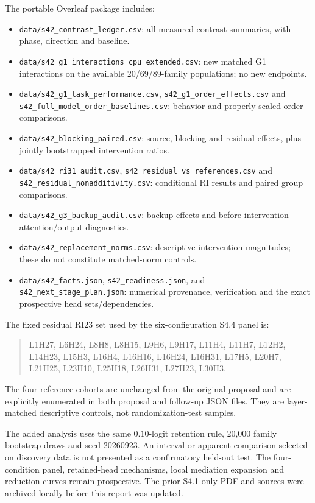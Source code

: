 \documentclass[11pt,a4paper]{article}
\newcommand{\file}[1]{\nolinkurl{#1}}
\begin{document}
The portable Overleaf package includes:
\begin{itemize}
\item \file{data/s42_contrast_ledger.csv}: all measured contrast summaries, with phase, direction and baseline.
\item \file{data/s42_g1_interactions_cpu_extended.csv}: new matched G1 interactions on the available 20/69/89-family populations; no new endpoints.
\item \file{data/s42_g1_task_performance.csv}, \file{s42_g1_order_effects.csv} and \file{s42_full_model_order_baselines.csv}: behavior and properly scaled order comparisons.
\item \file{data/s42_blocking_paired.csv}: source, blocking and residual effects, plus jointly bootstrapped intervention ratios.
\item \file{data/s42_ri31_audit.csv}, \file{s42_residual_vs_references.csv} and \file{s42_residual_nonadditivity.csv}: conditional RI results and paired group comparisons.
\item \file{data/s42_g3_backup_audit.csv}: backup effects and before-intervention attention/output diagnostics.
\item \file{data/s42_replacement_norms.csv}: descriptive intervention magnitudes; these do not constitute matched-norm controls.
\item \file{data/s42_facts.json}, \file{s42_readiness.json}, and \file{s42_next_stage_plan.json}: numerical provenance, verification and the exact prospective head sets/dependencies.
\end{itemize}

The fixed residual RI23 set used by the six-configuration S4.4 panel is:
\begin{quote}\small
L1H27, L6H24, L8H8, L8H15, L9H6, L9H17, L11H4, L11H7, L12H2, L14H23, L15H3, L16H4, L16H16, L16H24, L16H31, L17H5, L20H7, L21H25, L23H10, L25H18, L26H31, L27H23, L30H3.
\end{quote}
The four reference cohorts are unchanged from the original proposal and are explicitly enumerated in both proposal and follow-up JSON files. They are layer-matched descriptive controls, not randomization-test samples.

The added analysis uses the same $0.10$-logit retention rule, 20,000 family bootstrap draws and seed 20260923. An interval or apparent comparison selected on discovery data is not presented as a confirmatory held-out test. The four-condition panel, retained-head mechanisms, local mediation expansion and reduction curves remain prospective. The prior S4.1-only PDF and sources were archived locally before this report was updated.
\end{document}
